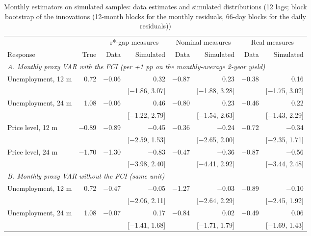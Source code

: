 \begin{table}[p]\centering\footnotesize\setlength{\tabcolsep}{3pt}
\caption{Monthly estimators on simulated samples: data estimates and simulated distributions (12 lags; block bootstrap of the innovations (12-month blocks for the monthly residuals, 66-day blocks for the daily residuals))}\label{tab:monthlyirfsimblock}
\begin{tabular}{lrrrrrrr}\toprule & & \multicolumn{2}{c}{r*-gap measures} & \multicolumn{2}{c}{Nominal measures} & \multicolumn{2}{c}{Real measures}\\ \cmidrule(lr){3-4}\cmidrule(lr){5-6}\cmidrule(lr){7-8}
Response & True & Data & Simulated & Data & Simulated & Data & Simulated\\ \midrule
\multicolumn{8}{l}{\textit{A. Monthly proxy VAR with the FCI (per +1 pp on the monthly-average 2-year yield)}}\\
\quad Unemployment, 12 m & 0.72 & $-$0.06 & 0.32 & $-$0.87 & 0.23 & $-$0.38 & 0.16\\
 &  &  & {\scriptsize [$-$1.86, 3.07]} &  & {\scriptsize [$-$1.88, 3.28]} &  & {\scriptsize [$-$1.75, 3.02]}\\
\quad Unemployment, 24 m & 1.08 & $-$0.06 & 0.46 & $-$0.80 & 0.23 & $-$0.46 & 0.22\\
 &  &  & {\scriptsize [$-$1.22, 2.79]} &  & {\scriptsize [$-$1.54, 2.63]} &  & {\scriptsize [$-$1.43, 2.29]}\\
\quad Price level, 12 m & $-$0.89 & $-$0.89 & $-$0.45 & $-$0.36 & $-$0.24 & $-$0.72 & $-$0.34\\
 &  &  & {\scriptsize [$-$2.59, 1.53]} &  & {\scriptsize [$-$2.65, 2.00]} &  & {\scriptsize [$-$2.35, 1.71]}\\
\quad Price level, 24 m & $-$1.70 & $-$1.30 & $-$0.83 & $-$0.47 & $-$0.36 & $-$0.87 & $-$0.56\\
 &  &  & {\scriptsize [$-$3.98, 2.40]} &  & {\scriptsize [$-$4.41, 2.92]} &  & {\scriptsize [$-$3.44, 2.48]}\\
\multicolumn{8}{l}{\textit{B. Monthly proxy VAR without the FCI (same unit)}}\\
\quad Unemployment, 12 m & 0.72 & $-$0.47 & $-$0.05 & $-$1.27 & $-$0.03 & $-$0.89 & $-$0.10\\
 &  &  & {\scriptsize [$-$2.06, 2.11]} &  & {\scriptsize [$-$2.64, 2.29]} &  & {\scriptsize [$-$2.45, 1.92]}\\
\quad Unemployment, 24 m & 1.08 & $-$0.07 & 0.17 & $-$0.84 & 0.02 & $-$0.49 & 0.06\\
 &  &  & {\scriptsize [$-$1.41, 1.68]} &  & {\scriptsize [$-$1.71, 1.79]} &  & {\scriptsize [$-$1.69, 1.43]}\\

\end{tabular}
\end{table}

